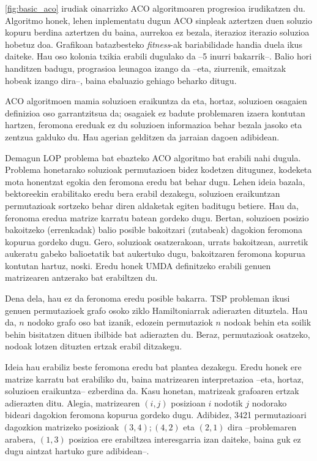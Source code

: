 \documentclass[eu]{ifirak}\usepackage[]{graphicx}\usepackage[]{color}
\newcommand{\eng}[1]{\textit{#1}}
\begin{document}
\ref{fig:basic_aco} irudiak oinarrizko ACO algoritmoaren progresioa irudikatzen du. Algoritmo honek, lehen inplementatu dugun ACO sinpleak aztertzen duen soluzio kopuru berdina aztertzen du baina, aurrekoa ez bezala, iterazioz iterazio soluzioa hobetuz doa. Grafikoan batazbesteko \eng{fitness}-ak bariabilidade handia duela ikus daiteke. Hau oso kolonia txikia erabili dugulako da --5 inurri bakarrik--. Balio hori handitzen badugu, prograsioa leunagoa izango da --eta, ziurrenik, emaitzak hobeak izango dira--, baina ebaluazio gehiago beharko ditugu.

ACO algoritmoen mamia soluzioen eraikuntza da eta, hortaz, soluzioen osagaien definizioa oso garrantzitsua da; osagaiek ez badute problemaren izaera kontutan hartzen, feromona ereduak ez du soluzioen informazioa behar bezala jasoko eta zentzua galduko du. Hau agerian gelditzen da jarraian dagoen adibidean.

Demagun LOP problema bat ebazteko ACO algoritmo bat erabili nahi dugula. Problema honetarako soluzioak permutazioen bidez kodetzen ditugunez, kodeketa mota honentzat egokia den feromona eredu bat behar dugu. Lehen ideia bazala, bektoreekin erabilitako eredu bera erabil dezakegu, soluzioen eraikuntzan permutazioak sortzeko behar diren aldaketak egiten baditugu betiere. Hau da, feronoma eredua matrize karratu batean gordeko dugu. Bertan, soluzioen posizio bakoitzeko (errenkadak) balio posible bakoitzari (zutabeak) dagokion feromona kopurua gordeko dugu. Gero, soluzioak osatzerakoan, urrats bakoitzean, aurretik aukeratu gabeko balioetatik bat aukertuko dugu, bakoitzaren feromona kopurua kontutan hartuz, noski. Eredu honek UMDA definitzeko erabili genuen matrizearen antzerako bat erabiltzen du. 

Dena dela, hau ez da feronoma eredu posible bakarra. TSP probleman ikusi genuen permutazioek grafo osoko ziklo Hamiltoniarrak adierazten dituztela. Hau da, $n$ nodoko grafo oso bat izanik, edozein permutaziok $n$ nodoak behin eta soilik behin bisitatzen dituen ibilbide bat adierazten du. Beraz, permutazioak osatzeko, nodoak lotzen dituzten ertzak erabil ditzakegu.

Ideia hau erabiliz beste feromona eredu bat plantea dezakegu. Eredu honek ere matrize karratu bat erabiliko du, baina matrizearen interpretazioa --eta, hortaz, soluzioen eraikuntza-- ezberdina da. Kasu honetan, matrizeak grafoaren ertzak adierazten ditu. Alegia, matrizearen $(i,j)$ posizioan $i$ nodotik $j$ nodorako bideari dagokion feromona kopurua gordeko dugu. Adibidez, 3421 permutazioari dagozkion matrizeko posizioak $(3,4); (4,2)$ eta $(2,1)$ dira --problemaren arabera, $(1,3)$ posizioa ere erabiltzea interesgarria izan daiteke, baina guk ez dugu aintzat hartuko gure adibidean--.
\end{document}
